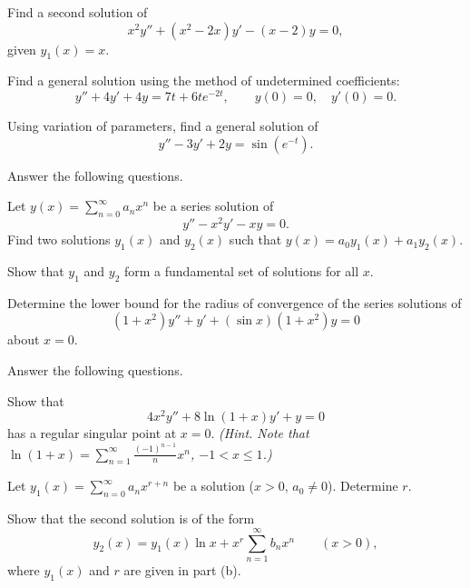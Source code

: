 \documentclass[11pt,oneside]{article}
\begin{document}
\begin{problem}
Find a second solution of
\[
x^2y''+(x^2-2x)y'-(x-2)y=0,
\]
given $y_1(x)=x$.
\end{problem}

\begin{problem}
Find a general solution using the method of undetermined coefficients:
\[
y''+4y'+4y=7t+6te^{-2t},\qquad y(0)=0,\quad y'(0)=0.
\]
\end{problem}

\begin{problem}
Using variation of parameters, find a general solution of
\[
y''-3y'+2y=\sin(e^{-t}).
\]
\end{problem}

\begin{problem}
Answer the following questions.
\begin{problemsubparts}
\item Let $y(x)=\sum_{n=0}^{\infty}a_nx^n$ be a series solution of
\[
y''-x^2y'-xy=0.
\]
Find two solutions $y_1(x)$ and $y_2(x)$ such that $y(x)=a_0y_1(x)+a_1y_2(x)$.
\item Show that $y_1$ and $y_2$ form a fundamental set of solutions for all $x$.
\end{problemsubparts}
\end{problem}

\begin{problem}
Determine the lower bound for the radius of convergence of the series solutions of
\[
(1+x^2)y''+y'+(\sin x)(1+x^2)y=0
\]
about $x=0$.
\end{problem}

\begin{problem}
Answer the following questions.
\begin{problemsubparts}
\item Show that
\[
4x^2y''+8\ln(1+x)y'+y=0
\]
has a regular singular point at $x=0$. \textit{(Hint. Note that $\ln(1+x)=\sum_{n=1}^{\infty}\frac{(-1)^{n-1}}n x^n$, $-1<x\le1$.)}
\item Let $y_1(x)=\sum_{n=0}^{\infty}a_nx^{r+n}$ be a solution ($x>0$, $a_0\ne0$). Determine $r$.
\item Show that the second solution is of the form
\[
y_2(x)=y_1(x)\ln x+x^r\sum_{n=1}^{\infty}b_nx^n\qquad(x>0),
\]
where $y_1(x)$ and $r$ are given in part (b).
\end{problemsubparts}
\end{problem}
\end{document}
